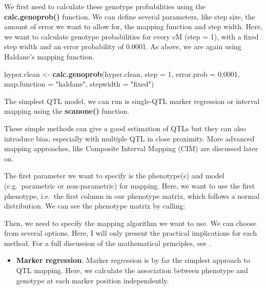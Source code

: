 \documentclass[12pt,]{krantz}
\makeatletter
\newenvironment{Shaded}{\begin{snugshade}}{\end{snugshade}}
\newcommand{\KeywordTok}[1]{\textcolor[rgb]{0.27,0.27,0.27}{\textbf{{#1}}}}
\newcommand{\DataTypeTok}[1]{\textcolor[rgb]{0.27,0.27,0.27}{{#1}}}
\newcommand{\DecValTok}[1]{\textcolor[rgb]{0.06,0.06,0.06}{{#1}}}
\newcommand{\FloatTok}[1]{\textcolor[rgb]{0.06,0.06,0.06}{{#1}}}
\newcommand{\StringTok}[1]{\textcolor[rgb]{0.5,0.5,0.5}{{#1}}}
\newcommand{\NormalTok}[1]{{#1}}
\providecommand{\tightlist}{%
  \setlength{\itemsep}{0pt}\setlength{\parskip}{0pt}}
\newenvironment{kframe}{%
\medskip{}
\setlength{\fboxsep}{.8em}
 \def\at@end@of@kframe{}%
 \ifinner\ifhmode%
  \def\at@end@of@kframe{\end{minipage}}%
  \begin{minipage}{\columnwidth}%
 \fi\fi%
 \def\FrameCommand##1{\hskip\@totalleftmargin \hskip-\fboxsep
 \colorbox{shadecolor}{##1}\hskip-\fboxsep
     \hskip-\linewidth \hskip-\@totalleftmargin \hskip\columnwidth}%
 \MakeFramed {\advance\hsize-\width
   \@totalleftmargin\z@ \linewidth\hsize
   \@setminipage}}%
 {\par\unskip\endMakeFramed%
 \at@end@of@kframe}
\renewenvironment{Shaded}{\begin{kframe}}{\end{kframe}}
\makeatother
\begin{document}
We first need to calculate these genotype probabilities using the
\textbf{calc.genoprob()} function. We can define several parameters,
like step size, the amount of error we want to allow for, the mapping
function and step width. Here, we want to calculate genotype
probabilities for every cM (step = 1), with a fixed step width and an
error probability of 0.0001. As above, we are again using Haldane's
mapping function.

\begin{Shaded}
\begin{Highlighting}[]
\NormalTok{hyper.clean <-}\StringTok{ }\KeywordTok{calc.genoprob}\NormalTok{(hyper.clean, }\DataTypeTok{step =} \DecValTok{1}\NormalTok{, }\DataTypeTok{error.prob =} \FloatTok{0.0001}\NormalTok{, }\DataTypeTok{map.function =} \StringTok{"haldane"}\NormalTok{, }\DataTypeTok{stepwidth =} \StringTok{"fixed"}\NormalTok{)}
\end{Highlighting}
\end{Shaded}

The simplest QTL model, we can run is single-QTL marker regression or
interval mapping using the \textbf{scanone()} function.

These simple methods can give a good estimation of QTLs but they can
also introduce bias, especially with multiple QTL in close proximity.
More advanced mapping approaches, like Composite Interval Mapping (CIM)
are discussed later on.

The first parameter we want to specify is the phenotype(s) and model
(e.g.~parametric or non-parametric) for mapping. Here, we want to use
the first phenotype, i.e.~the first column in our phenotype matrix,
which follows a normal distribution. We can see the phenotype matrix by
calling:

\begin{Shaded}
\end{Shaded}

Then, we need to specify the mapping algorithm we want to use. We can
choose from several options. Here, I will only present the practical
implications for each method. For a full discussion of the mathematical
principles, see \citet{lynch1998genetics}.

\begin{itemize}
\tightlist
\item
  \textbf{Marker regression}: Marker regression is by far the simplest
  approach to QTL mapping. Here, we calculate the association between
  phenotype and genotype at each marker position independently.
\end{itemize}
\end{document}
